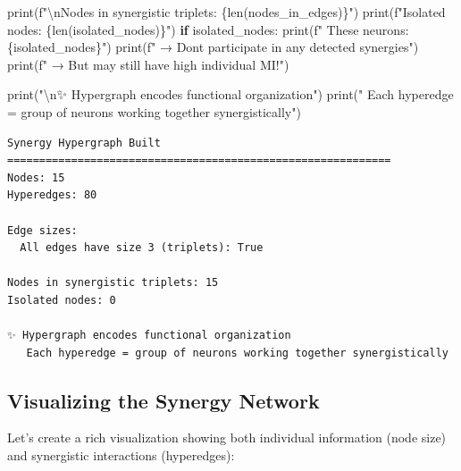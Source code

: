 \documentclass[
  11pt,
  letterpaper,
  oneside,
  openany]{book}
\newenvironment{Shaded}{\begin{snugshade}}{\end{snugshade}}
\newcommand{\BuiltInTok}[1]{\textcolor[rgb]{0.00,0.23,0.31}{#1}}
\newcommand{\CharTok}[1]{\textcolor[rgb]{0.13,0.47,0.30}{#1}}
\newcommand{\ControlFlowTok}[1]{\textcolor[rgb]{0.00,0.23,0.31}{\textbf{#1}}}
\newcommand{\NormalTok}[1]{\textcolor[rgb]{0.00,0.23,0.31}{#1}}
\newcommand{\SpecialCharTok}[1]{\textcolor[rgb]{0.37,0.37,0.37}{#1}}
\newcommand{\SpecialStringTok}[1]{\textcolor[rgb]{0.13,0.47,0.30}{#1}}
\newcommand{\StringTok}[1]{\textcolor[rgb]{0.13,0.47,0.30}{#1}}
\begin{document}
\begin{Shaded}
\begin{Highlighting}[]
\BuiltInTok{print}\NormalTok{(}\SpecialStringTok{f"}\CharTok{\textbackslash{}n}\SpecialStringTok{Nodes in synergistic triplets: }\SpecialCharTok{\{}\BuiltInTok{len}\NormalTok{(nodes\_in\_edges)}\SpecialCharTok{\}}\SpecialStringTok{"}\NormalTok{)}
\BuiltInTok{print}\NormalTok{(}\SpecialStringTok{f"Isolated nodes: }\SpecialCharTok{\{}\BuiltInTok{len}\NormalTok{(isolated\_nodes)}\SpecialCharTok{\}}\SpecialStringTok{"}\NormalTok{)}
\ControlFlowTok{if}\NormalTok{ isolated\_nodes:}
    \BuiltInTok{print}\NormalTok{(}\SpecialStringTok{f"  These neurons: }\SpecialCharTok{\{}\NormalTok{isolated\_nodes}\SpecialCharTok{\}}\SpecialStringTok{"}\NormalTok{)}
    \BuiltInTok{print}\NormalTok{(}\SpecialStringTok{f"  → Don\textquotesingle{}t participate in any detected synergies"}\NormalTok{)}
    \BuiltInTok{print}\NormalTok{(}\SpecialStringTok{f"  → But may still have high individual MI!"}\NormalTok{)}

\BuiltInTok{print}\NormalTok{(}\StringTok{"}\CharTok{\textbackslash{}n}\StringTok{✨ Hypergraph encodes functional organization"}\NormalTok{)}
\BuiltInTok{print}\NormalTok{(}\StringTok{"   Each hyperedge = group of neurons working together synergistically"}\NormalTok{)}
\end{Highlighting}
\end{Shaded}

\begin{verbatim}
Synergy Hypergraph Built
============================================================
Nodes: 15
Hyperedges: 80

Edge sizes:
  All edges have size 3 (triplets): True

Nodes in synergistic triplets: 15
Isolated nodes: 0

✨ Hypergraph encodes functional organization
   Each hyperedge = group of neurons working together synergistically
\end{verbatim}

\subsection{Visualizing the Synergy
Network}\label{visualizing-the-synergy-network}

Let's create a rich visualization showing both individual information
(node size) and synergistic interactions (hyperedges):
\end{document}
